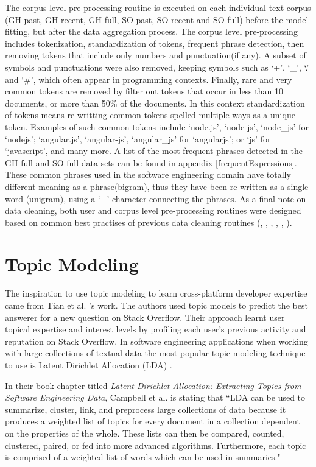 The corpus level pre-processing routine is executed on each individual text corpus (GH-past, GH-recent, GH-full, SO-past, SO-recent and SO-full) before the model fitting, but after the data aggregation process. The corpus level pre-processing includes tokenization, standardization of tokens, frequent phrase detection, then removing tokens that include only numbers and punctuation(if any). A subset of symbols and punctuations were also removed, keeping symbols such as ‘+’, ‘\_’, ‘.’ and ‘\#’, which often appear in programming contexts. Finally, rare and very common tokens are removed by filter out tokens that occur in less than 10 documents, or more than 50\% of the documents. In this context standardization of tokens means re-writting common tokens spelled multiple ways as a unique token. Examples of such common tokens include ‘node.js’, ‘node-js’, ‘node\_js’ for ‘nodejs’; ‘angular.js’, ‘angular-js’, ‘angular\_js’ for ‘angularjs’; or ‘js’ for ‘javascript’, and many more. A list of the most frequent phrases detected in the GH-full and SO-full data sets can be found in appendix \ref{frequentExpressions}. These common phrases used in the software engineering domain have totally different meaning as a phrase(bigram), thus they have been re-written as a single word (unigram), using a ‘\_’ character connecting the phrases. As a final note on data cleaning, both user and corpus level pre-processing routines were designed based on common best practises of previous data cleaning routines (\cite{tian2013predicting}, \cite{campbell2015latent}, \cite{treude2019predicting}, \cite{efstathiou2018word}, \cite{boyd2014care}, \cite{liao2019status}).

\section{Topic Modeling}
The inspiration to use topic modeling to learn cross-platform developer expertise came from Tian et al. \cite{tian2013predicting}'s work. The authors used topic models to predict the best answerer for a new question on Stack Overflow. Their approach learnt user topical expertise and interest levels by profiling each user's previous activity and reputation on Stack Overflow. In software engineering applications when working with large collections of textual data the most popular topic modeling technique to use is Latent Dirichlet Allocation (LDA) \cite{campbell2015latent}. 

In their book chapter titled \textit{Latent Dirichlet Allocation: Extracting Topics from Software Engineering Data}, Campbell et al. \cite{campbell2015latent} is stating that ``LDA can be used to summarize, cluster, link, and preprocess large collections of data because it produces a weighted list of topics for every document in a collection dependent on the properties of the whole. These lists can then be compared, counted, clustered, paired, or fed into more advanced algorithms. Furthermore, each topic is comprised of a weighted list of words which can be used in summaries."

